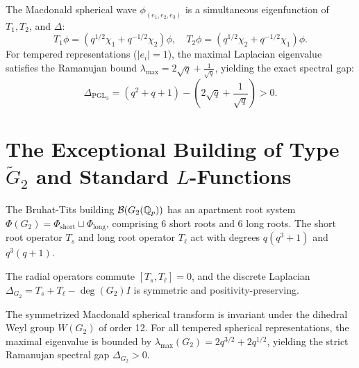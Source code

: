 \begin{theorem}
\label{thm:macdonald_ramanujan_pgl3}
\leanok
The Macdonald spherical wave $\phi_{(e_1, e_2, e_3)}$ is a simultaneous eigenfunction of $T_1, T_2$, and $\Delta$:
\[
T_1 \phi = \left(q^{1/2} \chi_1 + q^{-1/2} \chi_2\right) \phi, \quad T_2 \phi = \left(q^{1/2} \chi_2 + q^{-1/2} \chi_1\right) \phi.
\]
For tempered representations ($|e_i| = 1$), the maximal Laplacian eigenvalue satisfies the Ramanujan bound $\lambda_{\max} = 2\sqrt{q} + \frac{1}{\sqrt{q}}$, yielding the exact spectral gap:
\[
\Delta_{\mathrm{PGL}_3} = (q^2 + q + 1) - \left(2\sqrt{q} + \frac{1}{\sqrt{q}}\right) > 0.
\]
\end{theorem}

\section{The Exceptional Building of Type $\widetilde{G}_2$ and Standard $L$-Functions}

\begin{definition}
\label{def:building_g2}
\leanok
The Bruhat-Tits building $\mathcal{B}(G_2(\mathbb{Q}_p))$ has an apartment root system $\Phi(G_2) = \Phi_{\mathrm{short}} \sqcup \Phi_{\mathrm{long}}$, comprising 6 short roots and 6 long roots. The short root operator $T_s$ and long root operator $T_\ell$ act with degrees $q(q^3+1)$ and $q^3(q+1)$.
\end{definition}

\begin{theorem}
\label{thm:building_g2_commute}
\leanok
The radial operators commute $[T_s, T_\ell] = 0$, and the discrete Laplacian $\Delta_{G_2} = T_s + T_\ell - \deg(G_2) I$ is symmetric and positivity-preserving.
\end{theorem}

\begin{theorem}
\label{thm:ramanujan_gap_g2}
\leanok
The symmetrized Macdonald spherical transform is invariant under the dihedral Weyl group $W(G_2)$ of order 12. For all tempered spherical representations, the maximal eigenvalue is bounded by $\lambda_{\max}(G_2) = 2 q^{3/2} + 2 q^{1/2}$, yielding the strict Ramanujan spectral gap $\Delta_{G_2} > 0$.
\end{theorem}

